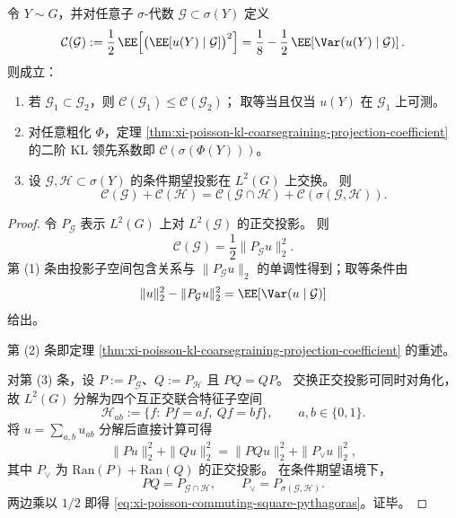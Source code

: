 \begin{theorem}\label{thm:xi-poisson-second-order-petz-commuting-square}
令 \(Y\sim G\)，并对任意子 \(\sigma\)-代数 \(\mathcal G\subset \sigma(Y)\) 定义
\[
\mathcal C(\mathcal G)
:=\frac12\,\EE\!\left[\bigl(\EE[u(Y)\mid \mathcal G]\bigr)^2\right]
=\frac18-\frac12\,\EE\!\left[\Var(u(Y)\mid\mathcal G)\right].
\]
则成立：
\begin{enumerate}
  \item 若 \(\mathcal G_1\subset\mathcal G_2\)，则 \(\mathcal C(\mathcal G_1)\le \mathcal C(\mathcal G_2)\)；
  取等当且仅当 \(u(Y)\) 在 \(\mathcal G_1\) 上可测。
  \item 对任意粗化 \(\Phi\)，定理
  \ref{thm:xi-poisson-kl-coarsegraining-projection-coefficient} 的二阶 KL 领先系数即
  \(
  \mathcal C(\sigma(\Phi(Y)))
  \)。
  \item 设 \(\mathcal G,\mathcal H\subset \sigma(Y)\) 的条件期望投影在 \(L^2(G)\) 上交换。
  则
  \begin{equation}\label{eq:xi-poisson-commuting-square-pythagoras}
  \boxed{
  \mathcal C(\mathcal G)+\mathcal C(\mathcal H)
  =\mathcal C(\mathcal G\cap\mathcal H)+\mathcal C(\sigma(\mathcal G,\mathcal H))
  }.
  \end{equation}
\end{enumerate}
\end{theorem}

\begin{proof}
令 \(P_{\mathcal G}\) 表示 \(L^2(G)\) 上对 \(L^2(\mathcal G)\) 的正交投影。
则
\[
\mathcal C(\mathcal G)=\frac12\|P_{\mathcal G}u\|_2^2.
\]
第 (1) 条由投影子空间包含关系与
\(
\|P_{\mathcal G}u\|_2
\)
的单调性得到；取等条件由
\[
\|u\|_2^2-\|P_{\mathcal G}u\|_2^2
=\EE[\Var(u\mid\mathcal G)]
\]
给出。

第 (2) 条即定理
\ref{thm:xi-poisson-kl-coarsegraining-projection-coefficient}
的重述。

对第 (3) 条，设 \(P:=P_{\mathcal G}\)、\(Q:=P_{\mathcal H}\) 且 \(PQ=QP\)。
交换正交投影可同时对角化，故 \(L^2(G)\) 分解为四个互正交联合特征子空间
\[
\mathcal H_{ab}:=\{f:\ Pf=af,\ Qf=bf\},\qquad a,b\in\{0,1\}.
\]
将 \(u=\sum_{a,b}u_{ab}\) 分解后直接计算可得
\[
\|Pu\|_2^2+\|Qu\|_2^2
=\|PQu\|_2^2+\|P_{\vee}u\|_2^2,
\]
其中 \(P_{\vee}\) 为 \(\mathrm{Ran}(P)+\mathrm{Ran}(Q)\) 的正交投影。
在条件期望语境下，
\[
PQ=P_{\mathcal G\cap\mathcal H},\qquad
P_{\vee}=P_{\sigma(\mathcal G,\mathcal H)}.
\]
两边乘以 \(1/2\) 即得
\eqref{eq:xi-poisson-commuting-square-pythagoras}。证毕。
\end{proof}

\endinput
